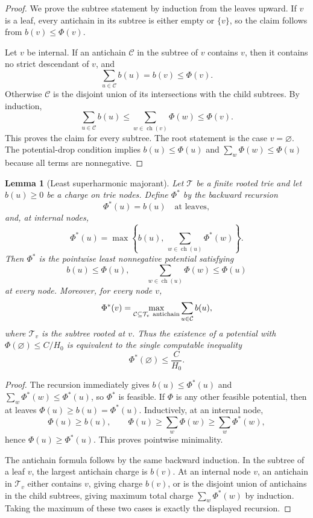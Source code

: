 \documentclass[10pt]{article}
\newtheorem{lemma}[theorem]{Lemma}
\theoremstyle{definition}
\begin{document}
\begin{proof}
   We prove the subtree statement by induction from the leaves upward.  If
   \(v\) is a leaf, every antichain in its subtree is either empty or
   \(\{v\}\), so the claim follows from \(b(v)\le\Phi(v)\).

   Let \(v\) be internal.  If an antichain \(\mathcal C\) in the subtree of
   \(v\) contains \(v\), then it contains no strict descendant of \(v\), and
   \[
      \sum_{u\in\mathcal C}b(u)=b(v)\le\Phi(v).
   \]
   Otherwise \(\mathcal C\) is the disjoint union of its intersections with
   the child subtrees.  By induction,
   \[
      \sum_{u\in\mathcal C}b(u)
      \le
      \sum_{w\in\operatorname{ch}(v)}\Phi(w)
      \le
      \Phi(v).
   \]
   This proves the claim for every subtree.  The root statement is the case
   \(v=\varnothing\).  The potential-drop condition implies
   \(b(u)\le\Phi(u)\) and
   \(\sum_w\Phi(w)\le\Phi(u)\) because all terms are nonnegative.
\end{proof}

\begin{lemma}[Least superharmonic majorant]
   \label{lem:least-superharmonic-majorant}
   Let \(\mathcal T\) be a finite rooted trie and let \(b(u)\ge0\) be a charge
   on trie nodes.  Define \(\Phi^*\) by the backward recursion
   \[
      \Phi^*(u)=b(u)\quad\text{at leaves},
   \]
   and, at internal nodes,
   \[
      \Phi^*(u)=
      \max\left\{
         b(u),\,
         \sum_{w\in\operatorname{ch}(u)}\Phi^*(w)
      \right\}.
   \]
   Then \(\Phi^*\) is the pointwise least nonnegative potential satisfying
   \[
      b(u)\le\Phi(u),
      \qquad
      \sum_{w\in\operatorname{ch}(u)}\Phi(w)\le\Phi(u)
   \]
   at every node.  Moreover, for every node \(v\),
   \[
      \Phi^*(v)
      =
      \max_{\mathcal C\subseteq\mathcal T_v\ {\rm antichain}}
      \sum_{u\in\mathcal C}b(u),
   \]
   where \(\mathcal T_v\) is the subtree rooted at \(v\).  Thus the existence
   of a potential with \(\Phi(\varnothing)\le C/H_0\) is equivalent to the
   single computable inequality
   \[
      \Phi^*(\varnothing)\le \frac{C}{H_0}.
   \]
\end{lemma}

\begin{proof}
   The recursion immediately gives \(b(u)\le\Phi^*(u)\) and
   \(\sum_w\Phi^*(w)\le\Phi^*(u)\), so \(\Phi^*\) is feasible.  If \(\Phi\) is
   any other feasible potential, then at leaves
   \(\Phi(u)\ge b(u)=\Phi^*(u)\).  Inductively, at an internal node,
   \[
      \Phi(u)
      \ge
      b(u),
      \qquad
      \Phi(u)
      \ge
      \sum_w\Phi(w)
      \ge
      \sum_w\Phi^*(w),
   \]
   hence \(\Phi(u)\ge\Phi^*(u)\).  This proves pointwise minimality.

   The antichain formula follows by the same backward induction.  In the
   subtree of a leaf \(v\), the largest antichain charge is \(b(v)\).  At an
   internal node \(v\), an antichain in \(\mathcal T_v\) either contains
   \(v\), giving charge \(b(v)\), or is the disjoint union of antichains in the
   child subtrees, giving maximum total charge
   \(\sum_w\Phi^*(w)\) by induction.  Taking the maximum of these two cases is
   exactly the displayed recursion.
\end{proof}
\end{document}

